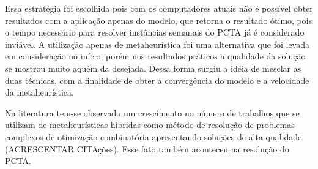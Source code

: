 Essa estratégia foi escolhida pois com os computadores atuais não é possível
obter resultados com a aplicação apenas do modelo, que retorna o resultado
ótimo, pois o tempo necessário para resolver instâncias semanais do PCTA já é
considerado inviável. A utilização apenas de metaheurística foi uma alternativa
que foi levada em consideração no início, porém nos resultados práticos a
qualidade da solução se mostrou muito aquém da desejada. Dessa forma surgiu a
idéia de mesclar as duas técnicas, com a finalidade de obter a convergência do
modelo e a velocidade da metaheurística.

Na literatura tem-se observado um crescimento no número de trabalhos que se
utilizam de metaheurísticas híbridas como método de resolução de problemas
complexos de otimização combinatória apresentando soluções de alta qualidade
(ACRESCENTAR CITAções). Esse fato também aconteceu na resolução do PCTA.






